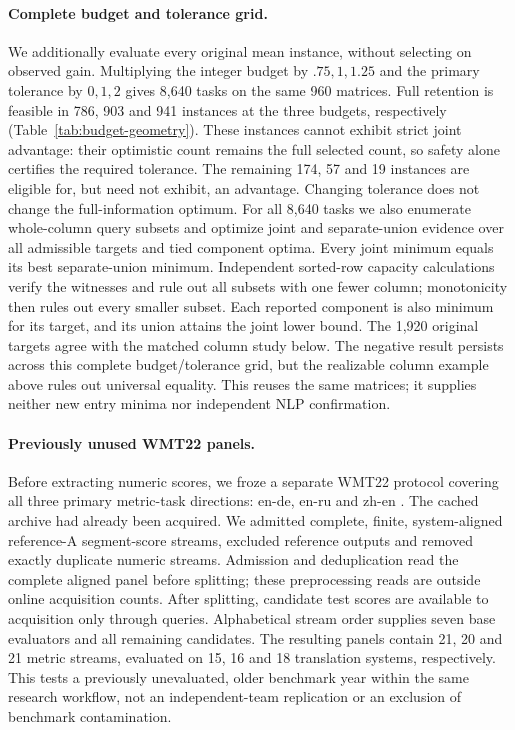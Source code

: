 \paragraph{Complete budget and tolerance grid.}
We additionally evaluate every original mean instance, without selecting on observed gain. Multiplying the integer budget by $.75,1,1.25$ and the primary tolerance by $0,1,2$ gives 8,640 tasks on the same 960 matrices. Full retention is feasible in 786, 903 and 941 instances at the three budgets, respectively (Table~\ref{tab:budget-geometry}). These instances cannot exhibit strict joint advantage: their optimistic count remains the full selected count, so safety alone certifies the required tolerance. The remaining 174, 57 and 19 instances are eligible for, but need not exhibit, an advantage. Changing tolerance does not change the full-information optimum. For all 8,640 tasks we also enumerate whole-column query subsets and optimize joint and separate-union evidence over all admissible targets and tied component optima. Every joint minimum equals its best separate-union minimum. Independent sorted-row capacity calculations verify the witnesses and rule out all subsets with one fewer column; monotonicity then rules out every smaller subset. Each reported component is also minimum for its target, and its union attains the joint lower bound. The 1,920 original targets agree with the matched column study below. The negative result persists across this complete budget/tolerance grid, but the realizable column example above rules out universal equality. This reuses the same matrices; it supplies neither new entry minima nor independent NLP confirmation.


\paragraph{Previously unused WMT22 panels.}
\label{app:wmt22-confirmation}
Before extracting numeric scores, we froze a separate WMT22 protocol covering all three primary metric-task directions: en-de, en-ru and zh-en \citep{freitag2022metrics}. The cached archive had already been acquired. We admitted complete, finite, system-aligned reference-A segment-score streams, excluded reference outputs and removed exactly duplicate numeric streams. Admission and deduplication read the complete aligned panel before splitting; these preprocessing reads are outside online acquisition counts. After splitting, candidate test scores are available to acquisition only through queries. Alphabetical stream order supplies seven base evaluators and all remaining candidates. The resulting panels contain 21, 20 and 21 metric streams, evaluated on 15, 16 and 18 translation systems, respectively. This tests a previously unevaluated, older benchmark year within the same research workflow, not an independent-team replication or an exclusion of benchmark contamination.


